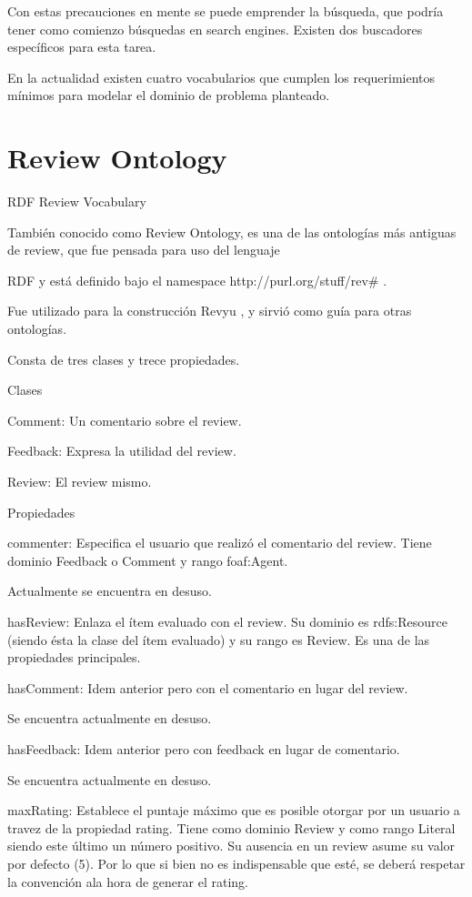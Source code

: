Con estas precauciones en mente se puede emprender la búsqueda, que podría tener como comienzo búsquedas en  search engines. 
Existen dos buscadores específicos para esta tarea.



%
En la actualidad existen cuatro vocabularios que cumplen los requerimientos mínimos para modelar el dominio de problema planteado.

\section{Review Ontology}

RDF Review Vocabulary

También conocido como Review Ontology, es una de las ontologías más antiguas de review, que fue pensada para uso del lenguaje 

RDF y está definido bajo el namespace http://purl.org/stuff/rev\# .

Fue utilizado para la construcción Revyu , y sirvió como guía para otras ontologías.

Consta de tres clases y trece propiedades.

Clases

Comment: Un comentario sobre el review. 

Feedback: Expresa la utilidad del review. 


Review: El review mismo. 


Propiedades


commenter: Especifica el usuario que realizó el comentario del review. Tiene dominio Feedback o Comment y rango foaf:Agent.


Actualmente se encuentra en desuso.


hasReview: Enlaza el ítem evaluado con el review. Su dominio es rdfs:Resource (siendo ésta la clase del ítem evaluado) y su rango es Review. Es una de 
las propiedades principales. 


hasComment: Idem anterior pero con el comentario en lugar del review.

Se encuentra actualmente en desuso.

hasFeedback: Idem anterior pero con feedback en lugar de comentario.

Se encuentra actualmente en desuso.


maxRating: Establece el puntaje máximo que es posible otorgar por un usuario a travez de la propiedad rating. Tiene como dominio 
Review y como rango Literal siendo este último un número positivo. Su ausencia en un review asume su valor por defecto (5). Por lo que 
si bien no es indispensable que esté, se deberá respetar la convención ala hora de generar el rating.



